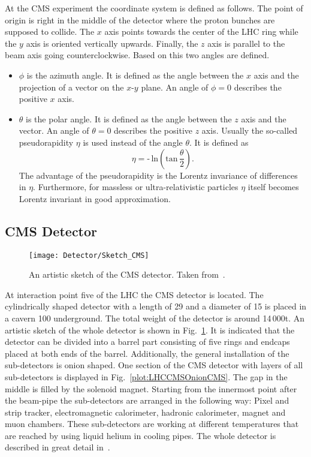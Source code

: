 At the CMS experiment the coordinate system is defined as follows. The point of origin is right in the middle of the detector where the proton bunches are supposed to collide. The $x$ axis points towards the center of the LHC ring while the $y$ axis is oriented vertically upwards. Finally, the $z$ axis is parallel to the beam axis going counterclockwise. Based on this two angles are defined.
\begin{itemize}
    \item{$\phi{}$} is the azimuth angle. It is defined as the angle between the $x$ axis and the projection of a vector on the $x$-$y$ plane. An angle of $\phi{} = 0$ describes the positive $x$ axis.
    \item{$\theta{}$} is the polar angle. It is defined as the angle between the $z$ axis and the vector. An angle of $\theta{} = 0$ describes the positive $z$ axis. Usually the so-called pseudorapidity $\eta{}$ is used instead of the angle $\theta$. It is defined as
    \begin{equation}
        \eta{} = \textrm{-}\,{}\textrm{ln} \left( \textrm{tan}\,{}\frac{\theta{}}{2}\right).
        \label{eq:pseudorapidity}
    \end{equation}
    The advantage of the pseudorapidity is the Lorentz invariance of differences in $\eta{}$. Furthermore, for massless or ultra-relativistic particles $\eta$ itself becomes Lorentz invariant in good approximation.
\end{itemize}

\subsection{CMS Detector \label{LHCCMSCMSDet}}

\begin{figure}[Hb]
    \centering
    \texttt{[image: Detector/Sketch\_CMS]}
    \caption[Artistic sketch of the CMS detector]{An artistic sketch of the CMS detector. Taken from~. \label{plot:LHCCMSWholeCMS}}
\end{figure}

At interaction point five of the LHC the CMS detector is located. The cylindrically shaped detector with a length of 29\m{} and a diameter of 15\m{} is placed in a cavern 100\m{} underground. The total weight of the detector is around 14\,000\unit{t}. An artistic sketch of the whole detector is shown in Fig.~\ref{plot:LHCCMSWholeCMS}. It is indicated that the detector can be divided into a barrel part consisting of five rings and endcaps placed at both ends of the barrel. Additionally, the general installation of the sub-detectors is onion shaped. One section of the CMS detector with layers of all sub-detectors is displayed in Fig.~\ref{plot:LHCCMSOnionCMS}. The gap in the middle is filled by the solenoid magnet. Starting from the innermost point after the beam-pipe the sub-detectors are arranged in the following way: Pixel and strip tracker, electromagnetic calorimeter, hadronic calorimeter, magnet and muon chambers. These sub-detectors are working at different temperatures that are reached by using liquid helium in cooling pipes. The whole detector is described in great detail in~\cite{Chatrchyan:1129810}.

